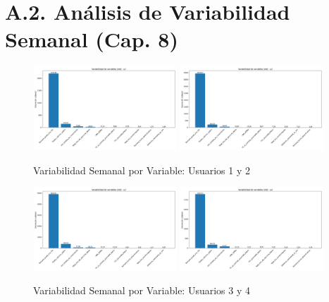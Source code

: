 \documentclass[12pt,letterpaper,twoside]{report}
\begin{document}
\clearpage

\section*{A.2. Análisis de Variabilidad Semanal (Cap. 8)}

\begin{figure}[H]
\centering
\includegraphics[width=0.48\textwidth]{figuras/variabilidad_variables_u1.png}
\includegraphics[width=0.48\textwidth]{figuras/variabilidad_variables_u2.png}
\caption{Variabilidad Semanal por Variable: Usuarios 1 y 2}
\end{figure}

\begin{figure}[H]
\centering
\includegraphics[width=0.48\textwidth]{figuras/variabilidad_variables_u3.png}
\includegraphics[width=0.48\textwidth]{figuras/variabilidad_variables_u4.png}
\caption{Variabilidad Semanal por Variable: Usuarios 3 y 4}
\end{figure}
\end{document}
